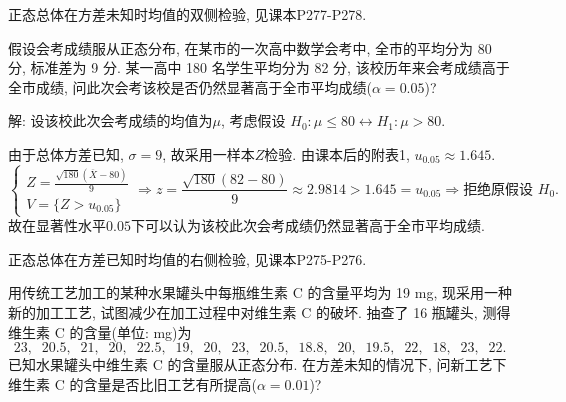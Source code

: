 \documentclass[standard]{ExBook}
\renewenvironment{shaded}{%
  \def\FrameCommand{\fboxsep=\FrameSep \colorbox{shadecolor}}%
  \MakeFramed{\advance\hsize-\width \FrameRestore}%
}{%
  \endMakeFramed
}
\begin{document}
\begin{qitems}
\textcolor{themeColor}{\selectfont {} 正态总体在方差未知时均值的双侧检验, 见课本P277-P278.}

\vspace{2.5cm-5em}

    \begin{bbox}
    \begin{shaded}
        \qitem
假设会考成绩服从正态分布, 在某市的一次高中数学会考中, 全市的平均分为 80 分, 标准差为 9 分. 某一高中 180 名学生平均分为 82 分, 该校历年来会考成绩高于全市成绩, 问此次会考该校是否仍然显著高于全市平均成绩($\alpha=0.05$)?
    \end{shaded}
    \end{bbox}

\vspace{\dimexpr2.5cm-5em\relax}

解: 设该校此次会考成绩的均值为$\mu$, 考虑假设
$
H_0:\mu\leq80
\longleftrightarrow
H_1:\mu>80
$.

由于总体方差已知, $\sigma=9$, 故采用一样本$Z$检验. 由课本后的附表1, $u_{0.05}\approx1.645$.
$$
\left\{
\begin{array}{l}
\displaystyle
Z=\frac{\sqrt{180}(\overline{X}-80)}{9}\\
V=\{Z>u_{0.05}\}
\end{array}
\right.
\Longrightarrow
z
=\frac{\sqrt{180}(82-80)}{9}
\approx2.9814
>1.645=u_{0.05}
\Longrightarrow
\text{拒绝原假设 }H_0.
$$
故在显著性水平$0.05$下可以认为该校此次会考成绩仍然显著高于全市平均成绩.

\textcolor{themeColor}{\selectfont {} 正态总体在方差已知时均值的右侧检验, 见课本P275-P276.}

\vspace{2.5cm-5em}

    \begin{bbox}
    \begin{shaded}
        \qitem
用传统工艺加工的某种水果罐头中每瓶维生素 C 的含量平均为 19 mg, 现采用一种新的加工工艺, 试图减少在加工过程中对维生素 C 的破坏. 抽查了 16 瓶罐头, 测得维生素 C 的含量(单位: mg)为
$$23, \;\; 20.5, \;\; 21, \;\; 20, \;\; 22.5, \;\; 19, \;\; 20, \;\; 23, \;\; 20.5, \;\; 18.8, \;\; 20, \;\; 19.5, \;\; 22, \;\; 18, \;\; 23, \;\; 22.$$
已知水果罐头中维生素 C 的含量服从正态分布. 在方差未知的情况下, 问新工艺下维生素 C 的含量是否比旧工艺有所提高($\alpha=0.01$)?
    \end{shaded}
    \end{bbox}

\vspace{\dimexpr2.5cm-5em\relax}


\end{qitems}
\end{document}

